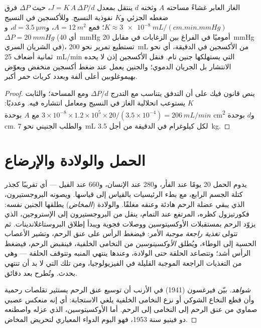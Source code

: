 \begin{theorem}\label{thm:b2:mammal-reproduction:fick}
الغاز العابر غشاءً مساحته $A$ وثخنه $d$ ينتقل بمعدل
$J = K\,A\,\Delta P/d$، حيث $\Delta P$ فرق
ضغطه الجزئي و$K$ نفوذية النسيج. وللأكسجين
في النسيج $K \approx \qty{3e-8}{mL/(cm.min.mmHg)}$؛ فمع $A =
\qty{12}{m^2}$، و$d = \qty{3.5}{\micro m}$، و$\Delta P =
\qty{20}{mmHg}$ (أي \qty{40}{mmHg} أموميًا في الفراغ بين الزغابات
في مقابل \qty{20}{mmHg} في الشريان السري)، تستطيع 
تمرير نحو \qty{200}{mL} من الأكسجين في الدقيقة، أي نحو ثمانية أضعاف
\qty{25}{mL/min} التي يستهلكها جنين تام. فنقل الأكسجين إذن
لا يحده الانتشار بل الجريان الدموي؛ والجنين يعمل عند ضغط
أكسجين منخفض ويعوّض بهيموغلوبين أعلى ألفة
وبعدد كريات حمر أكبر.
\end{theorem}
\begin{proof}
ينص قانون فيك على أن التدفق يتناسب مع التدرج
$\Delta P/d$ ومع المساحة؛ والثابت $K$ يستوعب انحلالية
الغاز في النسيج ومعامل انتشاره فيه. وعدديًا:
$3\times 10^{-8}\times 1.2\times 10^{5}\times 20/(3.5\times 10^{-4})
= \qty{206}{mL/min}$ مع $A$ بوحدة \unit{cm^2} و$d$ بوحدة \unit{cm}.
والطلب الجنيني نحو \qty{7}{mL} لكل كيلوغرام في الدقيقة من أجل
\qty{3.5}{kg}.
\end{proof}

\section{الحمل والولادة والإرضاع}

\begin{proposition}\label{prop:b2:mammal-reproduction:birth}
يدوم الحمل \num{20} يومًا عند الفأر، و\num{280} عند الإنسان، و\num{660}
عند الفيل --- أي تقريبًا كجذر كتلة الجسم الرابع، مع بطء
الرئيسيات بالقياس إلى قياسها. ويصونه البروجستيرون،
الذي يبقي عضلة الرحم هادئة وعنقه مغلقًا. والولادة
(\emph{المخاض}) يطلقها الجنين نفسه: فكورتيزول كظره،
المرتفع عند التمام، ينقل  من البروجستيرون إلى
الإستروجين، الذي يزوّد الرحم بمستقبلات الأوكسيتوسين
ووصلات فجوية ويبدأ إطلاق البروستاغلاندينات. ثم تتولى
\emph{تغذية راجعة موجبة} الأمر: فيضغط الرأس على عنق الرحم، وتشير
الأعصاب الحسية إلى الوطاء، ويُطلق \emph{الأوكسيتوسين} من
النخامى الخلفية، فينقبض الرحم، فيضغط الرأس أشد؛
وتتصاعد الحلقة حتى الولادة، وعندها ينتهي المنبه
وتتوقف الحلقة --- وهي من التغذيات الراجعة الموجبة القليلة في
الفيزيولوجيا، ومن تلك التي لا بد أن تنتهي بحدث. وتُطرح 
بعد دقائق.
\end{proposition}
\begin{proof}[شواهد]
بيّن فيرغسون (1941) في الأرنب أن توسيع عنق الرحم
يستثير تقلصات رحمية وأن قطع النخاع الشوكي أو
نزع النخامى الخلفية يلغي الاستجابة: أي إنه
منعكس عصبي صماوي من عنق الرحم إلى النخامى إلى الرحم. أما
الأوكسيتوسين، الذي عزله واصطنعه دو فينيو سنة 1953، فهو اليوم الدواء
المعياري لتحريض المخاض.
\end{proof}

